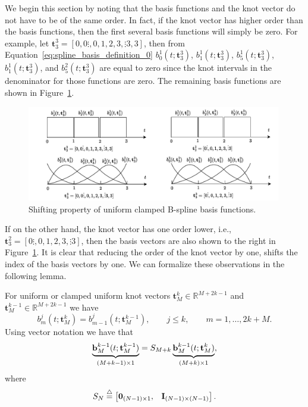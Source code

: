 We begin this section by noting that the basis functions and the knot vector do not have to be of the same order.  In fact, if the knot vector has higher order than the basis functions, then the first several basis functions will simply be zero.  
For example, let $\mathbf{t}_3^3 = [0, 0\vdots, 0, 1, 2, 3, \vdots 3, 3]$, then from Equation~\eqref{eq:spline_basis_definition_0} $b_0^1(t; \mathbf{t}_3^3)$, $b_1^1(t; \mathbf{t}_3^3)$, $b_5^1(t; \mathbf{t}_3^3)$, $b_1^1(t; \mathbf{t}_3^3)$, and $b_5^2(t; \mathbf{t}_3^3)$ are equal to zero since the knot intervals in the denominator for those functions are zero.  The remaining basis functions are shown in Figure~\ref{fig:shifting_property}.
\begin{figure}[hbt]
  \centering\includegraphics[width=0.99\textwidth]{./chap5_trajectory_planning/figures/shifting_property}
  \caption{Shifting property of uniform clamped B-spline basis functions.}
  \label{fig:shifting_property}  
\end{figure}
If on the other hand, the knot vector has one order lower, i.e., $\mathbf{t}_3^2 = [0\vdots, 0, 1, 2, 3, \vdots 3]$, then the basis vectors are also shown to the right in Figure~\ref{fig:shifting_property}.  It is clear that reducing the order of the knot vector by one, shifts the index of the basis vectors by one.  We can formalize these observations in the following lemma.
\begin{lemma} \label{lem:shifting_property}
For uniform or clamped uniform knot vectors $\mathbf{t}_M^k \in \mathbb{R}^{M+2k-1}$ and $\mathbf{t}_M^{k-1}\in\mathbb{R}^{M+2k-1}$ we have
\[
b_m^j(t; \mathbf{t}_M^k) = b_{m-1}^j(t; \mathbf{t}_M^{k-1}), \qquad j \leq k, \qquad m = 1, \dots, 2k+M.
\]	
Using vector notation we have that
\[
\underbrace{\mathbf{b}_M^{k-1}(t; \mathbf{t}_M^{k-1})}_{(M+k-1)\times 1} = S_{M+k} \underbrace{\mathbf{b}_M^{k-1}(t; \mathbf{t}_M^k)}_{(M+k)\times 1},
\]
where
\[
	S_{N} \stackrel{\triangle}{=} \begin{bmatrix} \mathbf{0}_{(N-1)\times 1}, & \mathbf{I}_{(N-1) \times (N-1)} \end{bmatrix}.
\]
\end{lemma}

